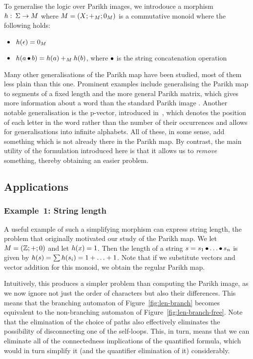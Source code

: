 \documentclass[acmsmall,review,anonymous]{acmart}\settopmatter{printfolios=true,printccs=false,printacmref=true}
\theoremstyle{definition}
\begin{document}
To generalise the logic over Parikh images, we introdouce a morphism $h:\: \Sigma
\to M$ where $M = \left(X;+_{M};0_{M}\right)$ is a commutative monoid where the following holds:
\begin{itemize}
  \item $h(\epsilon) = 0_{M}$
  \item $h(a \operatorname{\bullet} b) = h(a) +_{M} h(b)$, where $\operatorname{\bullet}$ is
  the string concatenation operation
\end{itemize}

Many other generalisations of the Parikh map have been studied, most of them
less plain than this one. Prominent examples include generalising the Parikh map
to segments of a fixed length \cite{KARHUMAKI1980155} and the more general
Parikh matrix, which gives more information about a word than the standard
Parikh image \cite{parikh-matrix}. Another notable generalisation is the
p-vector, introduced in~\cite{infinite-words}, which denotes the position of
each letter in the word rather than the number of their occurrences and allows
for generalisations into infinite alphabets. All of these, in some sense, add
something which is not already there in the Parikh map. By contrast, the main
utility of the formulation introduced here is that it allows us to \emph{remove}
something, thereby obtaining an easier problem.

\subsection{Applications}

\subsubsection{Example~1: String length}

A useful example of such a simplifying morphism can express string length, the
problem that originally motivated our study of the Parikh map. We let $M =
\left(\mathbb{Z};+;0\right)$ and let $h(x) = 1$. Then the length of a string
$s = s_1 \operatorname{\bullet} \ldots \operatorname{\bullet}  s_n$ is given by $h(s) = \sum h(s_i) = 1
+ \ldots + 1$. Note that if we substitute vectors and vector addition for
this monoid, we obtain the regular Parikh map.

Intuitively, this produces a simpler problem than computing the Parikh image, as
we now ignore not just the order of characters but also their differences. This
means that the branching automaton of Figure~\ref{fig:len-branch} becomes
equivalent to the non-branching automaton of Figure~\ref{fig:len-branch-free}.
Note that the elimination of the choice of paths also effectively eliminates the
possibility of disconnecting one of the self-loops. This, in turn, means that we
can eliminate all of the connectedness implications of the quantified formula,
which would in turn simplify it (and the quantifier elimination of it)
considerably.
\end{document}
